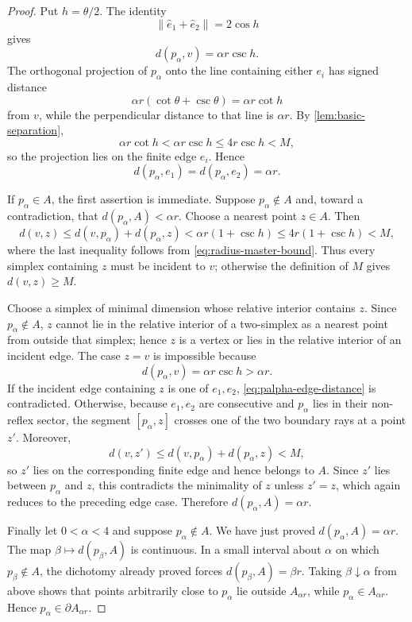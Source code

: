 \documentclass[11pt]{article}
\numberwithin{equation}{section}
\begin{document}
\begin{proof}
Put $h=\theta/2$. The identity
\[
\|\widehat e_1+\widehat e_2\|=2\cos h
\]
gives
\[
d(p_\alpha,v)=\alpha r\csc h.
\]
The orthogonal projection of $p_\alpha$ onto the line containing either $e_i$ has signed distance
\[
\alpha r(\cot\theta+\csc\theta)=\alpha r\cot h
\]
from $v$, while the perpendicular distance to that line is $\alpha r$. By \cref{lem:basic-separation},
\[
\alpha r\cot h<\alpha r\csc h\le4r\csc h<M,
\]
so the projection lies on the finite edge $e_i$. Hence
\begin{equation}\label{eq:palpha-edge-distance}
d(p_\alpha,e_1)=d(p_\alpha,e_2)=\alpha r.
\end{equation}

If $p_\alpha\in A$, the first assertion is immediate. Suppose $p_\alpha\notin A$ and, toward a contradiction, that $d(p_\alpha,A)<\alpha r$. Choose a nearest point $z\in A$. Then
\[
d(v,z)
\le d(v,p_\alpha)+d(p_\alpha,z)
<\alpha r\left(1+\csc h\right)
\le4r(1+\csc h)<M,
\]
where the last inequality follows from \eqref{eq:radius-master-bound}. Thus every simplex containing $z$ must be incident to $v$; otherwise the definition of $M$ gives $d(v,z)\ge M$.

Choose a simplex of minimal dimension whose relative interior contains $z$. Since $p_\alpha\notin A$, $z$ cannot lie in the relative interior of a two-simplex as a nearest point from outside that simplex; hence $z$ is a vertex or lies in the relative interior of an incident edge. The case $z=v$ is impossible because
\[
d(p_\alpha,v)=\alpha r\csc h>\alpha r.
\]
If the incident edge containing $z$ is one of $e_1,e_2$, \eqref{eq:palpha-edge-distance} is contradicted. Otherwise, because $e_1,e_2$ are consecutive and $p_\alpha$ lies in their non-reflex sector, the segment $[p_\alpha,z]$ crosses one of the two boundary rays at a point $z'$. Moreover,
\[
d(v,z')\le d(v,p_\alpha)+d(p_\alpha,z)<M,
\]
so $z'$ lies on the corresponding finite edge and hence belongs to $A$. Since $z'$ lies between $p_\alpha$ and $z$, this contradicts the minimality of $z$ unless $z'=z$, which again reduces to the preceding edge case. Therefore $d(p_\alpha,A)=\alpha r$.

Finally let $0<\alpha<4$ and suppose $p_\alpha\notin A$. We have just proved $d(p_\alpha,A)=\alpha r$. The map $\beta\mapsto d(p_\beta,A)$ is continuous. In a small interval about $\alpha$ on which $p_\beta\notin A$, the dichotomy already proved forces $d(p_\beta,A)=\beta r$. Taking $\beta\downarrow\alpha$ from above shows that points arbitrarily close to $p_\alpha$ lie outside $A_{\alpha r}$, while $p_\alpha\in A_{\alpha r}$. Hence $p_\alpha\in\partial A_{\alpha r}$.
\end{proof}
\end{document}
